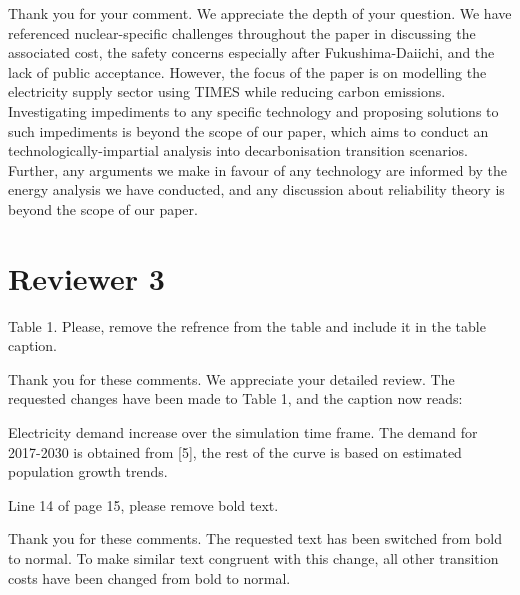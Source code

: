 \documentclass[answers,11pt]{exam}
\begin{document}
\begin{questions}
        \begin{solution}
        
                 Thank you for your comment. We appreciate the depth of your question. We have referenced nuclear-specific challenges throughout the paper in discussing the associated cost, the safety concerns especially after Fukushima-Daiichi, and the lack of public acceptance. However, the focus of the paper is on modelling the electricity supply sector using TIMES while reducing carbon emissions. Investigating impediments to any specific technology and proposing solutions to such impediments is beyond the scope of our paper, which aims to conduct an technologically-impartial analysis into decarbonisation transition scenarios. Further, any arguments we make in favour of any technology are informed by the energy analysis we have conducted, and any discussion about reliability theory is beyond the scope of our paper.
                 
                 
        \end{solution} 
        

        \section{Reviewer 3}
        
         \question Table 1. Please, remove the refrence from the table and include it in the table caption.
        \begin{solution}
                Thank you for these comments. We appreciate your detailed review. The requested changes have been made to Table 1, and the caption now reads:
                
                Electricity demand increase over the simulation time frame. The demand for 2017-2030 is obtained from [5], the rest of the curve is based on estimated population growth trends.
                
        \end{solution}  

         \question Line 14 of page 15, please remove bold text.
        \begin{solution}
                Thank you for these comments. The requested text has been switched from bold to normal. To make similar text congruent with this change, all other transition costs have been changed from bold to normal.
                
        \end{solution}  
 
\end{questions}
%
%
\end{document}
